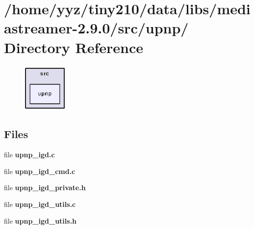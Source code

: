 \section{/home/yyz/tiny210/data/libs/mediastreamer-\/2.9.0/src/upnp/ Directory Reference}
\label{dir_a6b80c526cc322a5f77995c0425c4de9}


\nopagebreak
\begin{figure}[H]
\begin{center}
\leavevmode
\includegraphics[width=65pt]{dir_a6b80c526cc322a5f77995c0425c4de9_dep}
\end{center}
\end{figure}
\subsection*{Files}
\begin{DoxyCompactItemize}
\item 
file {\bfseries upnp\_\-igd.c}
\item 
file {\bfseries upnp\_\-igd\_\-cmd.c}
\item 
file {\bfseries upnp\_\-igd\_\-private.h}
\item 
file {\bfseries upnp\_\-igd\_\-utils.c}
\item 
file {\bfseries upnp\_\-igd\_\-utils.h}
\end{DoxyCompactItemize}
